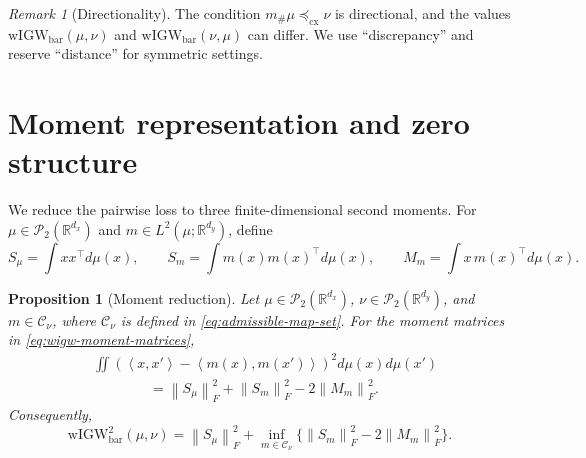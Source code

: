\documentclass[11pt]{article}
\newcommand{\R}{\mathbb R}
\newcommand{\cP}{\mathcal P}
\newcommand{\ip}[2]{\left\langle #1,#2\right\rangle}
\newcommand{\norm}[1]{\left\lVert #1\right\rVert}
\newcommand{\cx}{\preceq_{\mathrm{cx}}}
\newcommand{\wIGW}{\mathrm{wIGW}_{\mathrm{bar}}}
\theoremstyle{plain}
\newtheorem{proposition}[theorem]{Proposition}
\theoremstyle{definition}
\theoremstyle{remark}
\newtheorem{remark}[theorem]{Remark}
\begin{document}

\begin{remark}[Directionality]
The condition \(m_\#\mu\cx\nu\) is directional, and the values
\(\wIGW(\mu,\nu)\) and \(\wIGW(\nu,\mu)\) can differ. We use ``discrepancy'' and
reserve ``distance'' for symmetric settings.
\end{remark}

\section{Moment representation and zero structure}
\label{sec:moment-representation}

We reduce the pairwise loss to three finite-dimensional second moments. For
$\mu\in\cP_2(\R^{d_x})$ and
$m\in L^2(\mu;\R^{d_y})$, define
\begin{equation}\label{eq:wigw-moment-matrices}
  S_\mu=\int xx^\top d\mu(x),\qquad
  S_m=\int m(x)m(x)^\top d\mu(x),\qquad
  M_m=\int x\,m(x)^\top d\mu(x).
\end{equation}

\begin{proposition}[Moment reduction]\label{prop:moment}
Let $\mu\in\cP_2(\R^{d_x})$, $\nu\in\cP_2(\R^{d_y})$, and
$m\in\mathcal C_\nu$, where $\mathcal C_\nu$ is defined in
\eqref{eq:admissible-map-set}. For the moment matrices in
\eqref{eq:wigw-moment-matrices},
\[
\begin{aligned}
  &\iint\left(\ip{x}{x'}-\ip{m(x)}{m(x')}\right)^2d\mu(x)d\mu(x')\\
  &\hspace{4em}=\norm{S_\mu}_F^2+\norm{S_m}_F^2-2\norm{M_m}_F^2.
\end{aligned}
\]
Consequently,
\[
  \wIGW^2(\mu,\nu)=\norm{S_\mu}_F^2+
  \inf_{m\in\mathcal C_\nu}\{\norm{S_m}_F^2-2\norm{M_m}_F^2\}.
\]
\end{proposition}
\end{document}

